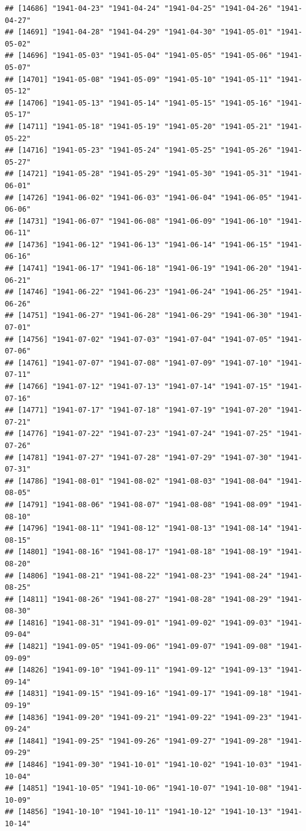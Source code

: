 \documentclass{article}\usepackage[]{graphicx}\usepackage[]{color}
\makeatletter
\newenvironment{kframe}{%
 \def\at@end@of@kframe{}%
 \ifinner\ifhmode%
  \def\at@end@of@kframe{\end{minipage}}%
  \begin{minipage}{\columnwidth}%
 \fi\fi%
 \def\FrameCommand##1{\hskip\@totalleftmargin \hskip-\fboxsep
 \colorbox{shadecolor}{##1}\hskip-\fboxsep
     \hskip-\linewidth \hskip-\@totalleftmargin \hskip\columnwidth}%
 \MakeFramed {\advance\hsize-\width
   \@totalleftmargin\z@ \linewidth\hsize
   \@setminipage}}%
 {\par\unskip\endMakeFramed%
 \at@end@of@kframe}
\newenvironment{knitrout}{}{} %
\makeatother
\begin{document}
\begin{description}
\begin{knitrout}
\begin{kframe}
\begin{verbatim}
## [14686] "1941-04-23" "1941-04-24" "1941-04-25" "1941-04-26" "1941-04-27"
## [14691] "1941-04-28" "1941-04-29" "1941-04-30" "1941-05-01" "1941-05-02"
## [14696] "1941-05-03" "1941-05-04" "1941-05-05" "1941-05-06" "1941-05-07"
## [14701] "1941-05-08" "1941-05-09" "1941-05-10" "1941-05-11" "1941-05-12"
## [14706] "1941-05-13" "1941-05-14" "1941-05-15" "1941-05-16" "1941-05-17"
## [14711] "1941-05-18" "1941-05-19" "1941-05-20" "1941-05-21" "1941-05-22"
## [14716] "1941-05-23" "1941-05-24" "1941-05-25" "1941-05-26" "1941-05-27"
## [14721] "1941-05-28" "1941-05-29" "1941-05-30" "1941-05-31" "1941-06-01"
## [14726] "1941-06-02" "1941-06-03" "1941-06-04" "1941-06-05" "1941-06-06"
## [14731] "1941-06-07" "1941-06-08" "1941-06-09" "1941-06-10" "1941-06-11"
## [14736] "1941-06-12" "1941-06-13" "1941-06-14" "1941-06-15" "1941-06-16"
## [14741] "1941-06-17" "1941-06-18" "1941-06-19" "1941-06-20" "1941-06-21"
## [14746] "1941-06-22" "1941-06-23" "1941-06-24" "1941-06-25" "1941-06-26"
## [14751] "1941-06-27" "1941-06-28" "1941-06-29" "1941-06-30" "1941-07-01"
## [14756] "1941-07-02" "1941-07-03" "1941-07-04" "1941-07-05" "1941-07-06"
## [14761] "1941-07-07" "1941-07-08" "1941-07-09" "1941-07-10" "1941-07-11"
## [14766] "1941-07-12" "1941-07-13" "1941-07-14" "1941-07-15" "1941-07-16"
## [14771] "1941-07-17" "1941-07-18" "1941-07-19" "1941-07-20" "1941-07-21"
## [14776] "1941-07-22" "1941-07-23" "1941-07-24" "1941-07-25" "1941-07-26"
## [14781] "1941-07-27" "1941-07-28" "1941-07-29" "1941-07-30" "1941-07-31"
## [14786] "1941-08-01" "1941-08-02" "1941-08-03" "1941-08-04" "1941-08-05"
## [14791] "1941-08-06" "1941-08-07" "1941-08-08" "1941-08-09" "1941-08-10"
## [14796] "1941-08-11" "1941-08-12" "1941-08-13" "1941-08-14" "1941-08-15"
## [14801] "1941-08-16" "1941-08-17" "1941-08-18" "1941-08-19" "1941-08-20"
## [14806] "1941-08-21" "1941-08-22" "1941-08-23" "1941-08-24" "1941-08-25"
## [14811] "1941-08-26" "1941-08-27" "1941-08-28" "1941-08-29" "1941-08-30"
## [14816] "1941-08-31" "1941-09-01" "1941-09-02" "1941-09-03" "1941-09-04"
## [14821] "1941-09-05" "1941-09-06" "1941-09-07" "1941-09-08" "1941-09-09"
## [14826] "1941-09-10" "1941-09-11" "1941-09-12" "1941-09-13" "1941-09-14"
## [14831] "1941-09-15" "1941-09-16" "1941-09-17" "1941-09-18" "1941-09-19"
## [14836] "1941-09-20" "1941-09-21" "1941-09-22" "1941-09-23" "1941-09-24"
## [14841] "1941-09-25" "1941-09-26" "1941-09-27" "1941-09-28" "1941-09-29"
## [14846] "1941-09-30" "1941-10-01" "1941-10-02" "1941-10-03" "1941-10-04"
## [14851] "1941-10-05" "1941-10-06" "1941-10-07" "1941-10-08" "1941-10-09"
## [14856] "1941-10-10" "1941-10-11" "1941-10-12" "1941-10-13" "1941-10-14"

\end{verbatim}
\end{kframe}
\end{knitrout}
\end{description}
\end{document}
